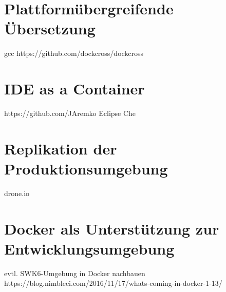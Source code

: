 \section{Plattformübergreifende Übersetzung}
\label{sec:plattformuebergreifende-uebersetzung}
gcc
https://github.com/dockcross/dockcross
\section{IDE as a Container}
\label{sec:ideasacontainer}
https://github.com/JAremko
Eclipse Che
\section{Replikation der Produktionsumgebung}
\label{sec:replikation-produktionsumgebung}
drone.io
\section{Docker als Unterstützung zur Entwicklungsumgebung}
\label{sec:docker-assistance}
evtl. SWK6-Umgebung in Docker nachbauen
https://blog.nimbleci.com/2016/11/17/whats-coming-in-docker-1-13/





